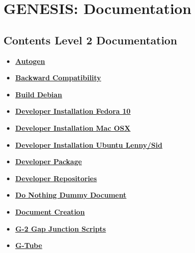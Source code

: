 \documentclass[12pt]{article}
\begin{document}
\section*{GENESIS: Documentation}

\subsection*{Contents Level 2 Documentation}

\begin{itemize}

\item \href{../autogen/autogen.pdf}{\bf \underline{Autogen}}

\item \href{../backward-compatibility/backward-compatibility.pdf}{\bf \underline{Backward Compatibility}}

\item \href{../build-debian/build-debian.pdf}{\bf \underline{Build Debian}}

\item \href{../installation-fedora10/installation-fedora10.pdf}{\bf \underline{Developer Installation Fedora 10}}

\item \href{../installation-osx/installation-osx.pdf}{\bf \underline{Developer Installation Mac OSX}}

\item \href{../installation-ubuntu-lennysid/installation-ubuntu-lennysid.pdf}{\bf \underline{Developer Installation Ubuntu Lenny/Sid}}

\item \href{../developer-package/developer-package.pdf}{\bf \underline{Developer Package}}

\item \href{../developer-repository/developer-repository.pdf}{\bf \underline{Developer Repositories}}

\item \href{../do-nothing/do-nothing.pdf}{\bf \underline{Do Nothing Dummy Document}}

\item \href{../document-create/document-create.pdf}{\bf \underline{Document Creation}}

\item \href{../g2-gap-junction/g2-gap-junction.pdf}{\bf \underline{G-2 Gap Junction Scripts}}

\item \href{../gtube/gtube.pdf}{\bf \underline{G-Tube}}


\end{itemize}
\end{document}
